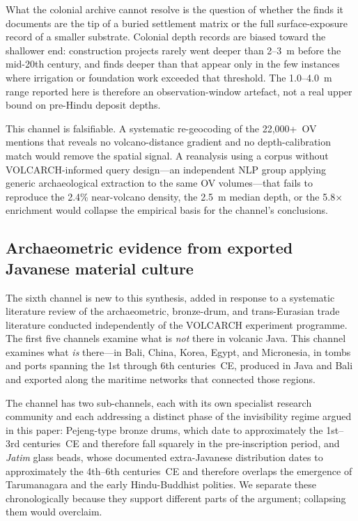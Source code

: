 \documentclass[12pt,a4paper]{article}
\begin{document}
What the colonial archive cannot resolve is the question of whether the finds it documents are the tip of a buried settlement matrix or the full surface-exposure record of a smaller substrate. Colonial depth records are biased toward the shallower end: construction projects rarely went deeper than 2--3~m before the mid-20th century, and finds deeper than that appear only in the few instances where irrigation or foundation work exceeded that threshold. The 1.0--4.0~m range reported here is therefore an observation-window artefact, not a real upper bound on pre-Hindu deposit depths.

This channel is falsifiable. A systematic re-geocoding of the 22{,}000+~OV mentions that reveals no volcano-distance gradient and no depth-calibration match would remove the spatial signal. A reanalysis using a corpus without VOLCARCH-informed query design---an independent NLP group applying generic archaeological extraction to the same OV volumes---that fails to reproduce the 2.4\% near-volcano density, the 2.5~m median depth, or the 5.8$\times$ enrichment would collapse the empirical basis for the channel's conclusions.


\subsection{Archaeometric evidence from exported Javanese material culture}
\label{sec:ch6}

The sixth channel is new to this synthesis, added in response to a systematic literature review of the archaeometric, bronze-drum, and trans-Eurasian trade literature conducted independently of the VOLCARCH experiment programme. The first five channels examine what is \textit{not} there in volcanic Java. This channel examines what \textit{is} there---in Bali, China, Korea, Egypt, and Micronesia, in tombs and ports spanning the 1st through 6th centuries~CE, produced in Java and Bali and exported along the maritime networks that connected those regions.

The channel has two sub-channels, each with its own specialist research community and each addressing a distinct phase of the invisibility regime argued in this paper: Pejeng-type bronze drums, which date to approximately the 1st--3rd centuries~CE and therefore fall squarely in the pre-inscription period, and \textit{Jatim} glass beads, whose documented extra-Javanese distribution dates to approximately the 4th--6th centuries~CE and therefore overlaps the emergence of Tarumanagara and the early Hindu-Buddhist polities. We separate these chronologically because they support different parts of the argument; collapsing them would overclaim.
\end{document}
